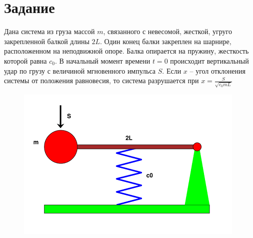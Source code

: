
\section{Задание}

 Дана система из груза массой $m$, связанного с невесомой, жесткой, угруго закрепленной балкой длины $2L$. Один конец балки закреплен на шарнире, расположенном на неподвижной опоре. Балка опирается на пружину, жесткость которой равна $c_0$. В начальный момент времени $t=0$ происходит вертикальный удар по грузу с величиной мгновенного импульса $S$. Если $x$ -- угол отклонения системы от положения равновесия, то система разрушается при $x = \frac{S}{\sqrt{c_0 m L}}$ 

 \begin{figure}[htb]
  \centering
   \includegraphics{fig1.png}
 \end{figure}
